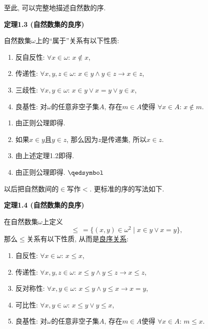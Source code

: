 \documentclass[UTF8]{ctexart}
\begin{document}
\newpage

至此, 可以完整地描述自然数的序.

\vspace{10pt}

\hypertarget{sec:定理1.3}{}
\noindent\textbf{定理1.3 (自然数集的良序)}

自然数集$\omega$上的``属于''关系有以下性质:
\begin{enumerate}
    \item 反自反性: $\forall x\in\omega:\,x\notin x$,
    \item 传递性: $\forall x,y,z\in\omega:\,x\in y\land y\in z\to x\in z$,
    \item 三歧性: $\forall x,y\in\omega:\,x\in y\lor x=y\lor y\in x$,
    \item 良基性: 对$\omega$的任意非空子集$A$, 存在$m\in A$使得
    $\forall x\in A:\,x\notin m$.
\end{enumerate}


\begin{enumerate}
    \item 由正则公理即得.
    \item 如果$x\in y$且$y\in z$, 那么因为$z$是传递集, 所以$x\in z$.
    \item 由上述定理1.2即得.
    \item 由正则公理即得. \hfill $\qedsymbol$
\end{enumerate}

\vspace{10pt}

以后把自然数间的$\in$写作$<$. 更标准的序的写法如下.

\vspace{10pt}

\hypertarget{sec:定理1.4}{}
\noindent\textbf{定理1.4 (自然数集的良序)}

在自然数集$\omega$上定义
\[
    \leqslant\,=\{(x,y)\in\omega^2\mid x\in y\lor x=y\},
\]
那么$\leqslant$关系有以下性质,
从而是\href{../../04 序理论/01 序关系/04 良序关系#nameddest=sec:定义1.1}{良序关系}:
\begin{enumerate}
    \item 自反性: $\forall x\in\omega:\,x\leqslant x$,
    \item 传递性: $\forall x,y,z\in\omega:\,
    x\leqslant y\land y\leqslant z\to x\leqslant z$,
    \item 反对称性: $\forall x,y\in\omega:\,
    x\leqslant y\land y\leqslant x\to x=y$,
    \item 可比性: $\forall x,y\in\omega:\,x\leqslant y\lor y\leqslant x$,
    \item 良基性: 对$\omega$的任意非空子集$A$, 存在$m\in A$使得
    $\forall x\in A:\,m\leqslant x$.
\end{enumerate}
\end{document}
